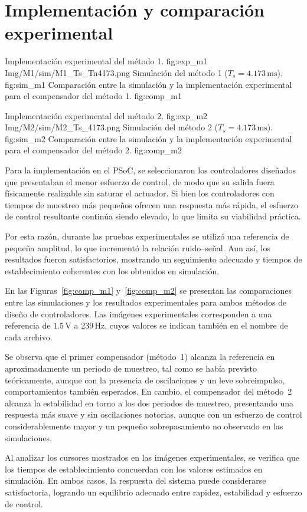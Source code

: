 
\twocolumn
\section{Implementación y comparación experimental}


{Implementación experimental del método 1.}
{fig:exp_m1}
{Img/M1/sim/M1_Ts_Tn4173.png}
{Simulación del método 1 ($T_s = 4.173\,\text{ms}$).}
{fig:sim_m1}
{Comparación entre la simulación y la implementación experimental para el compensador del método 1.}
{fig:comp_m1}

{Implementación experimental del método 2.}
{fig:exp_m2}
{Img/M2/sim/M2_Ts_4173.png}
{Simulación del método 2 ($T_s = 4.173\,\text{ms}$).}
{fig:sim_m2}
{Comparación entre la simulación y la implementación experimental para el compensador del método 2.}
{fig:comp_m2}

Para la implementación en el PSoC, se seleccionaron los controladores diseñados que presentaban el menor esfuerzo de control, de modo que su salida fuera físicamente realizable sin saturar el actuador.  
Si bien los controladores con tiempos de muestreo más pequeños ofrecen una respuesta más rápida, el esfuerzo de control resultante continúa siendo elevado, lo que limita su viabilidad práctica.

Por esta razón, durante las pruebas experimentales se utilizó una referencia de pequeña amplitud, lo que incrementó la relación ruido–señal. Aun así, los resultados fueron satisfactorios, mostrando un seguimiento adecuado y tiempos de establecimiento coherentes con los obtenidos en simulación.

En las Figuras~\ref{fig:comp_m1} y~\ref{fig:comp_m2} se presentan las comparaciones entre las simulaciones y los resultados experimentales para ambos métodos de diseño de controladores.  
Las imágenes experimentales corresponden a una referencia de \(1.5\,\text{V}\) a \(239\,\text{Hz}\), cuyos valores se indican también en el nombre de cada archivo.




Se observa que el primer compensador (método~1) alcanza la referencia en aproximadamente un periodo de muestreo, tal como se había previsto teóricamente, aunque con la presencia de oscilaciones y un leve sobreimpulso, comportamientos también esperados.  
En cambio, el compensador del método~2 alcanza la estabilidad en torno a los dos periodos de muestreo, presentando una respuesta más suave y sin oscilaciones notorias, aunque con un esfuerzo de control considerablemente mayor y un pequeño sobrepasamiento no observado en las simulaciones.

Al analizar los cursores mostrados en las imágenes experimentales, se verifica que los tiempos de establecimiento concuerdan con los valores estimados en simulación. En ambos casos, la respuesta del sistema puede considerarse satisfactoria, logrando un equilibrio adecuado entre rapidez, estabilidad y esfuerzo de control.


